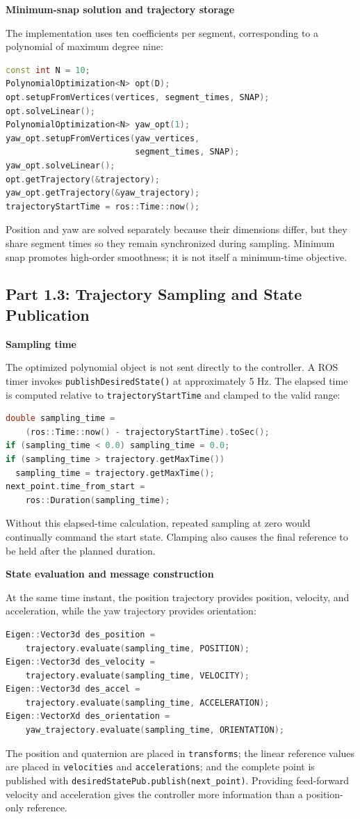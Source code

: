 \documentclass[letterpaper,10pt,conference]{IEEEtran}
\newcommand{\labstep}[1]{%
  \par\vspace{0.38\baselineskip}%
  \noindent\textbf{#1}\par\nobreak
  \vspace{0.10\baselineskip}%
}
\begin{document}
\labstep{Minimum-snap solution and trajectory storage}
The implementation uses ten coefficients per segment, corresponding to a polynomial of maximum degree nine:
\begin{lstlisting}[language=C++]
const int N = 10;
PolynomialOptimization<N> opt(D);
opt.setupFromVertices(vertices, segment_times, SNAP);
opt.solveLinear();
PolynomialOptimization<N> yaw_opt(1);
yaw_opt.setupFromVertices(yaw_vertices,
                          segment_times, SNAP);
yaw_opt.solveLinear();
opt.getTrajectory(&trajectory);
yaw_opt.getTrajectory(&yaw_trajectory);
trajectoryStartTime = ros::Time::now();
\end{lstlisting}
Position and yaw are solved separately because their dimensions differ, but they share segment times so they remain synchronized during sampling. Minimum snap promotes high-order smoothness; it is not itself a minimum-time objective.

\subsection{Part 1.3: Trajectory Sampling and State Publication}
\labstep{Sampling time}
The optimized polynomial object is not sent directly to the controller. A ROS timer invokes \texttt{publishDesiredState()} at approximately 5 Hz. The elapsed time is computed relative to \texttt{trajectoryStartTime} and clamped to the valid range:
\begin{lstlisting}[language=C++]
double sampling_time =
    (ros::Time::now() - trajectoryStartTime).toSec();
if (sampling_time < 0.0) sampling_time = 0.0;
if (sampling_time > trajectory.getMaxTime())
  sampling_time = trajectory.getMaxTime();
next_point.time_from_start =
    ros::Duration(sampling_time);
\end{lstlisting}
Without this elapsed-time calculation, repeated sampling at zero would continually command the start state. Clamping also causes the final reference to be held after the planned duration.

\labstep{State evaluation and message construction}
At the same time instant, the position trajectory provides position, velocity, and acceleration, while the yaw trajectory provides orientation:
\begin{lstlisting}[language=C++]
Eigen::Vector3d des_position =
    trajectory.evaluate(sampling_time, POSITION);
Eigen::Vector3d des_velocity =
    trajectory.evaluate(sampling_time, VELOCITY);
Eigen::Vector3d des_accel =
    trajectory.evaluate(sampling_time, ACCELERATION);
Eigen::VectorXd des_orientation =
    yaw_trajectory.evaluate(sampling_time, ORIENTATION);
\end{lstlisting}
The position and quaternion are placed in \texttt{transforms}; the linear reference values are placed in \texttt{velocities} and \texttt{accelerations}; and the complete point is published with \texttt{desiredStatePub.publish(next\_point)}. Providing feed-forward velocity and acceleration gives the controller more information than a position-only reference.
\end{document}
